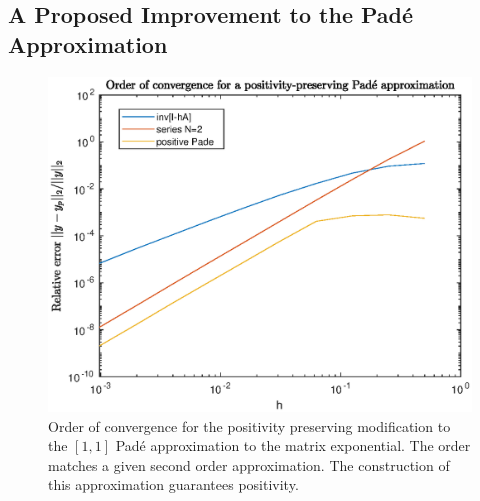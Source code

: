 
\subsection{A Proposed Improvement to the Pad\'e Approximation}

\begin{figure}
    \centering
    \includegraphics[width=0.75\linewidth]{Matlab/positivepadeconvergence.eps}
    \caption{
        Order of convergence for the positivity preserving modification to the $[1,1]$ Pad\'e approximation to the matrix exponential.
        The order matches a given second order approximation.
        The construction of this approximation guarantees positivity.
    }
    \label{fig:padepositive}
\end{figure}

